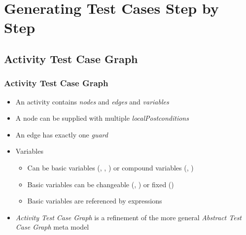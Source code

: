 \documentclass{beamer}
\begin{document}


\section{Generating Test Cases Step by Step}
\subsection{Activity Test Case Graph}

\begin{frame}
\frametitle{Activity Test Case Graph}
\begin{itemize}
\item An activity contains \emph{nodes} and \emph{edges} and \emph{variables}
\item A node can be supplied with multiple \emph{localPostconditions}
\item An edge has exactly one \emph{guard}
\item Variables
\begin{itemize}
\item Can be basic variables (, , ) or compound variables (, )
\item Basic variables can be changeable (, ) or fixed ()
\item Basic variables are referenced by expressions
\end{itemize}
\item \emph{Activity Test Case Graph} is a refinement of the more general \emph{Abstract Test Case Graph} meta model
\end{itemize}
\end{frame}
\end{document}

